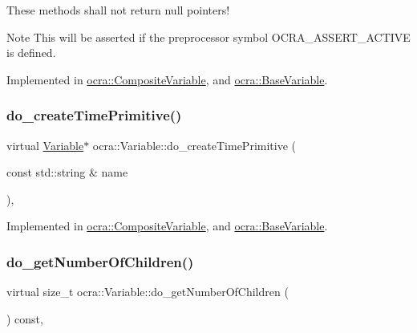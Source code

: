 These methods shall not return null pointers! \begin{DoxyNote}{Note}
This will be asserted if the preprocessor symbol O\+C\+R\+A\+\_\+\+A\+S\+S\+E\+R\+T\+\_\+\+A\+C\+T\+I\+VE is defined. 
\end{DoxyNote}


Implemented in \hyperlink{classocra_1_1CompositeVariable_a4ac0f033cea1cb5e4bfdb414765c3743}{ocra\+::\+Composite\+Variable}, and \hyperlink{classocra_1_1BaseVariable_a064b6501c110661e9fa12a0250d4de6b}{ocra\+::\+Base\+Variable}.

\hypertarget{classocra_1_1Variable_ae37610cbde7630dcda3dd6e09e251057}{}\label{classocra_1_1Variable_ae37610cbde7630dcda3dd6e09e251057} 
\subsubsection{\texorpdfstring{do\+\_\+create\+Time\+Primitive()}{do\_createTimePrimitive()}}
{\footnotesize\ttfamily virtual \hyperlink{classocra_1_1Variable}{Variable}$\ast$ ocra\+::\+Variable\+::do\+\_\+create\+Time\+Primitive (\begin{DoxyParamCaption}\item[{const std\+::string \&}]{name }\end{DoxyParamCaption})\hspace{0.3cm}{\ttfamily [protected]}, {}}



Implemented in \hyperlink{classocra_1_1CompositeVariable_a09fb82df36205326b995aca1dd8f14ba}{ocra\+::\+Composite\+Variable}, and \hyperlink{classocra_1_1BaseVariable_ab010bd127ba34ff57168bf69182a78d5}{ocra\+::\+Base\+Variable}.

\hypertarget{classocra_1_1Variable_a65de5b31613b74d83baab58f0eb43b35}{}\label{classocra_1_1Variable_a65de5b31613b74d83baab58f0eb43b35} 
\subsubsection{\texorpdfstring{do\+\_\+get\+Number\+Of\+Children()}{do\_getNumberOfChildren()}}
{\footnotesize\ttfamily virtual size\+\_\+t ocra\+::\+Variable\+::do\+\_\+get\+Number\+Of\+Children (\begin{DoxyParamCaption}{ }\end{DoxyParamCaption}) const\hspace{0.3cm}{\ttfamily [protected]}, {}}



